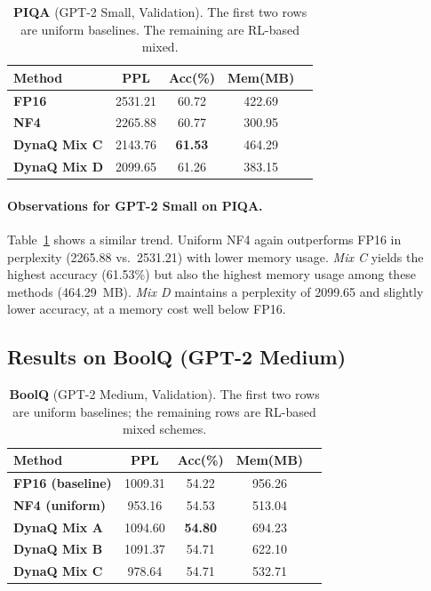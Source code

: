 \documentclass{article}
\begin{document}
	\begin{table}[ht]
		\centering
		\caption{\small \textbf{PIQA} (GPT-2 Small, Validation). The first two rows are uniform baselines. The remaining are RL-based mixed.}
		\label{tab:piqa-small}
		\begin{tabular}{lcccc}
			\toprule
			\textbf{Method} & \textbf{PPL} & \textbf{Acc(\%)} & \textbf{Mem(MB)} \\
			\midrule
			\textbf{FP16}    & 2531.21 & 60.72 & 422.69 \\
			\textbf{NF4}     & 2265.88 & 60.77 & 300.95 \\
			\midrule
			\textbf{DynaQ Mix C} & 2143.76 & \textbf{61.53} & 464.29 \\
			\textbf{DynaQ Mix D} & 2099.65 & 61.26 & 383.15 \\
			\bottomrule
		\end{tabular}
		\vspace{-0.5em}
	\end{table}
	
	\paragraph{Observations for GPT-2 Small on PIQA.}
	Table~\ref{tab:piqa-small} shows a similar trend. Uniform NF4 again outperforms FP16 in perplexity (2265.88 vs.\ 2531.21) with lower memory usage. \emph{Mix C} yields the highest accuracy (61.53\%) but also the highest memory usage among these methods (464.29~MB). \emph{Mix D} maintains a perplexity of 2099.65 and slightly lower accuracy, at a memory cost well below FP16.
	
	\subsection{Results on BoolQ (GPT-2 Medium)}
	\label{sec:boolq-medium}
	
	\begin{table}[ht]
		\centering
		\caption{\small \textbf{BoolQ} (GPT-2 Medium, Validation). The first two rows are uniform baselines; the remaining rows are RL-based mixed schemes.}
		\label{tab:boolq-medium}
		\begin{tabular}{lcccc}
			\toprule
			\textbf{Method} & \textbf{PPL} & \textbf{Acc(\%)} & \textbf{Mem(MB)} \\
			\midrule
			\textbf{FP16 (baseline)}  & 1009.31 & 54.22 & 956.26 \\
			\textbf{NF4 (uniform)}    & 953.16  & 54.53 & 513.04 \\
			\midrule
			\textbf{DynaQ Mix A}      & 1094.60 & \textbf{54.80} & 694.23 \\
			\textbf{DynaQ Mix B}      & 1091.37 & 54.71 & 622.10 \\
			\textbf{DynaQ Mix C}      & 978.64  & 54.71 & 532.71 \\
			\bottomrule
		\end{tabular}
		\vspace{-1em}
	\end{table}
	
\end{document}
